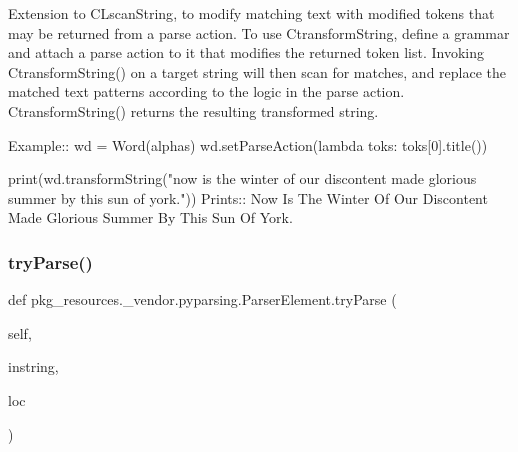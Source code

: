 \begin{DoxyVerb}Extension to C{L{scanString}}, to modify matching text with modified tokens that may
be returned from a parse action.  To use C{transformString}, define a grammar and
attach a parse action to it that modifies the returned token list.
Invoking C{transformString()} on a target string will then scan for matches,
and replace the matched text patterns according to the logic in the parse
action.  C{transformString()} returns the resulting transformed string.

Example::
    wd = Word(alphas)
    wd.setParseAction(lambda toks: toks[0].title())
    
    print(wd.transformString("now is the winter of our discontent made glorious summer by this sun of york."))
Prints::
    Now Is The Winter Of Our Discontent Made Glorious Summer By This Sun Of York.
\end{DoxyVerb}
 \mbox{\label{classpkg__resources_1_1__vendor_1_1pyparsing_1_1ParserElement_af8000cbf8e6f7daf91b5572a1d6c1266}} 
\subsubsection{\texorpdfstring{try\+Parse()}{tryParse()}}
{\footnotesize\ttfamily def pkg\+\_\+resources.\+\_\+vendor.\+pyparsing.\+Parser\+Element.\+try\+Parse (\begin{DoxyParamCaption}\item[{}]{self,  }\item[{}]{instring,  }\item[{}]{loc }\end{DoxyParamCaption})}

\mbox{\label{classpkg__resources_1_1__vendor_1_1pyparsing_1_1ParserElement_acef95ab1d929446bddf8dc7c5e143c43}} 
